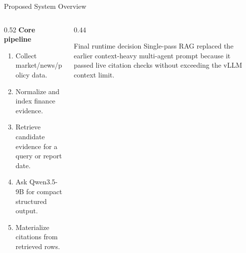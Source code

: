 \documentclass[aspectratio=169,11pt]{beamer}
\begin{document}
\begin{frame}{Proposed System Overview}
  \begin{columns}[T,onlytextwidth]
    \begin{column}{0.52\textwidth}
      \textbf{Core pipeline}
      \begin{enumerate}
        \item Collect market/news/policy data.
        \item Normalize and index finance evidence.
        \item Retrieve candidate evidence for a query or report date.
        \item Ask Qwen3.5-9B for compact structured output.
        \item Materialize citations from retrieved rows.
      \end{enumerate}
    \end{column}
    \begin{column}{0.44\textwidth}
      \begin{block}{Final runtime decision}
        Single-pass RAG replaced the earlier context-heavy multi-agent prompt because it passed live citation checks without exceeding the vLLM context limit.
      \end{block}
    \end{column}
  \end{columns}
\end{frame}
\end{document}
